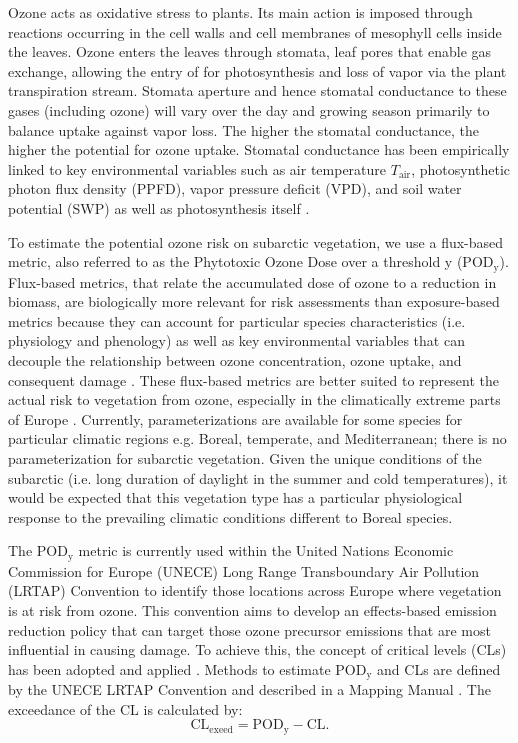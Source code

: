 \documentclass[bg, manuscript]{copernicus}
\begin{document}
Ozone acts as oxidative stress to plants. Its main action is imposed through reactions occurring in the cell walls and cell membranes of mesophyll cells inside the leaves. Ozone enters the leaves through stomata, leaf pores that enable gas exchange, allowing the entry of  for photosynthesis and loss of  vapor via the plant transpiration stream. Stomata aperture and hence stomatal conductance to these gases (including ozone) will vary over the day and growing season primarily to balance  uptake against  vapor loss. The higher the stomatal conductance, the higher the potential for ozone uptake. Stomatal conductance has been empirically linked to key environmental variables such as air temperature $T_\mathrm{air}$, photosynthetic photon flux density (PPFD), vapor pressure deficit (VPD), and soil water potential (SWP) as well as photosynthesis itself \citep[e.g.,][]{PTRS:Jarvis1976, BallBerry1987, Emberson2000, ICP:MappingManual2017}.

To estimate the potential ozone risk on subarctic vegetation, we use a flux-based metric, also referred to as the Phytotoxic Ozone Dose over a threshold y ($\mathrm{POD_y}$). Flux-based metrics, that relate the accumulated dose of ozone to a reduction in biomass, are biologically more relevant for risk assessments than exposure-based metrics because they can account for particular species characteristics (i.e. physiology and phenology) as well as key environmental variables that can decouple the relationship between ozone concentration, ozone uptake, and consequent damage \citep{PT:Emberson2020}. These flux-based metrics are better suited to represent the actual risk to vegetation from ozone, especially in the climatically extreme parts of Europe \citep{EP:Simpson2007,GCB:Mills2011,ICP:MappingManual2017}. Currently, parameterizations are available for some species for particular climatic regions e.g. Boreal, temperate, and Mediterranean; there is no parameterization for subarctic vegetation. Given the unique conditions of the subarctic (i.e. long duration of daylight in the summer and cold temperatures), it would be expected that this vegetation type has a particular physiological response to the prevailing climatic conditions different to Boreal species.  

The $\mathrm{POD_y}$ metric is currently used within the United Nations Economic Commission for Europe (UNECE) Long Range Transboundary Air Pollution (LRTAP) Convention to identify those locations across Europe where vegetation is at risk from ozone. This convention aims to develop an effects-based emission reduction policy that can target those ozone precursor emissions that are most influential in causing damage. To achieve this, the concept of critical levels (CLs) has been adopted and applied \citep{Maas2016}. Methods to estimate $\mathrm{POD_y}$ and CLs are defined by the UNECE LRTAP Convention and described in a Mapping Manual \citep[most recent version]{ICP:MappingManual2017}. The exceedance of the CL is calculated by: 
%
\begin{equation}
  \mathrm{CL_{exeed}} = \mathrm{POD_y} - \mathrm{CL}.
\end{equation}
%
\end{document}
